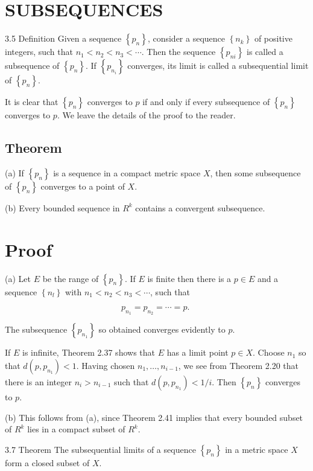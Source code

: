 \documentclass[10pt]{article}
\begin{document}
\section{SUBSEQUENCES}
3.5 Definition Given a sequence $\left\{p_{n}\right\}$, consider a sequence $\left\{n_{k}\right\}$ of positive integers, such that $n_{1}<n_{2}<n_{3}<\cdots$. Then the sequence $\left\{p_{n i}\right\}$ is called a subsequence of $\left\{p_{n}\right\}$. If $\left\{p_{n_{i}}\right\}$ converges, its limit is called a subsequential limit of $\left\{p_{n}\right\}$.

It is clear that $\left\{p_{n}\right\}$ converges to $p$ if and only if every subsequence of $\left\{p_{n}\right\}$ converges to $p$. We leave the details of the proof to the reader.

\subsection{Theorem}
(a) If $\left\{p_{n}\right\}$ is a sequence in a compact metric space $X$, then some subsequence of $\left\{p_{n}\right\}$ converges to a point of $X$.

(b) Every bounded sequence in $R^{k}$ contains a convergent subsequence.

\section{Proof}
(a) Let $E$ be the range of $\left\{p_{n}\right\}$. If $E$ is finite then there is a $p \in E$ and a sequence $\left\{n_{l}\right\}$ with $n_{1}<n_{2}<n_{3}<\cdots$, such that

$$
p_{n_{1}}=p_{n_{2}}=\cdots=p \text {. }
$$

The subsequence $\left\{p_{n_{1}}\right\}$ so obtained converges evidently to $p$.

If $E$ is infinite, Theorem 2.37 shows that $E$ has a limit point $p \in X$. Choose $n_{1}$ so that $d\left(p, p_{n_{1}}\right)<1$. Having chosen $n_{1}, \ldots, n_{i-1}$, we see from Theorem 2.20 that there is an integer $n_{i}>n_{i-1}$ such that $d\left(p, p_{n_{1}}\right)<1 / i$. Then $\left\{p_{n}\right\}$ converges to $p$.

(b) This follows from (a), since Theorem 2.41 implies that every bounded subset of $R^{k}$ lies in a compact subset of $R^{k}$.

3.7 Theorem The subsequential limits of a sequence $\left\{p_{n}\right\}$ in a metric space $X$ form a closed subset of $X$.
\end{document}
